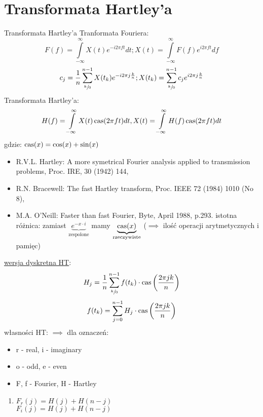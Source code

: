 \section{Transformata Hartley'a}
\begin{frame}[allowframebreaks]{Transformata Hartley'a}
	Tranformata Fouriera:
	\[
		F(f) = \int\limits_{-\infty}^{\infty} X(t) e^{-i2\pi ft} dt ; X(t) = \int\limits_{-\infty}^{\infty} F(f) e^{i2\pi ft} df
	\]
	\[
		c_j = \frac{1}{n} \sum\limits_{\sfrac{k}{0}}^{n-1} X(t_k) e^{-i2\pi j \frac{k}{n}} ; X(t_k) = \sum\limits_{\sfrac{k}{0}}^{n-1} c_j e^{i2\pi j \frac{k}{n}}
	\]
	Transformata Hartley'a:
	\[
		H(f) = \int\limits_{-\infty}^{\infty} X(t) \operatorname{cas}(2\pi ft) dt , X(t) = \int\limits_{-\infty}^{\infty} H(f) \operatorname{cas}(2\pi ft) dt
	\]
	gdzie: $\operatorname{cas}(x) = \cos(x) + \sin(x)$
	\begin{itemize}
		\item R.V.L. Hartley: A more symetrical Fourier analysis applied to transmission problems, Proc. IRE, 30 (1942) 144, \\
		\item R.N. Bracewell: The fast Hartley transform, Proc. IEEE 72 (1984) 1010 (No 8), \\
		\item M.A. O'Neill: Faster than fast Fourier, Byte, April 1988, p.293. istotna różnica: zamiast $\underbrace{e^{-x \cdot i}}_{\text{zespolone}}$ mamy $\underbrace{\operatorname{cas}(x)}_{\text{rzeczywiste}}$ ($\implies$ ilość operacji arytmetycznych i pamięc)
	\end{itemize}
	\underline{wersja dyskretna HT}:
	\[
		H_j = \frac{1}{n} \sum\limits_{\sfrac{k}{0}}^{n-1} f(t_k) \cdot \operatorname{cas} \bigg( \frac{2\pi jk}{n} \bigg)
	\]
	\[
		f(t_k) = \sum\limits_{j=0}^{n-1} H_j \cdot \operatorname{cas} \bigg( \frac{2\pi jk}{n} \bigg)
	\]
	własności HT: $\implies$ dla oznaczeń:
	\begin{itemize}
		\item r - real, i - imaginary \\
		\item o - odd, e - even \\
		\item F, f - Fourier, H - Hartley
	\end{itemize}
	\begin{block}{16.30}
		\centering
		\begin{enumerate}[1$^\circ$]
			\item $F_r(j) = H(j) + H(n-j)$ \\ $F_i(j) = H(j) + H(n-j)$ \\

\end{enumerate}
\end{block}
\end{frame}
